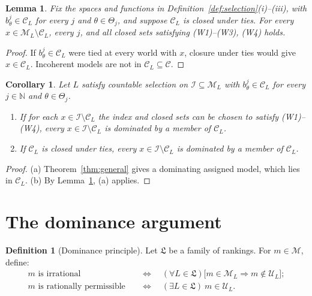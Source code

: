 \documentclass[11pt]{article}
\newtheorem{lemma}[theorem]{Lemma}
\newtheorem{corollary}[theorem]{Corollary}
\theoremstyle{definition}
\newtheorem{definition}[theorem]{Definition}
\theoremstyle{remark}
\newcommand{\M}{\mathcal M}
\newcommand{\C}{\mathcal C}
\newcommand{\I}{\mathcal I}
\newcommand{\U}{\mathcal U}
\newcommand{\Lf}{\mathfrak L}
\begin{document}
\begin{lemma}\label{lem:tie-sufficient}
Fix the spaces and functions in Definition~\ref{def:selection}(i)--(iii), with $b^j_\theta\in\C_L$ for every $j$ and $\theta\in\Theta_j$, and suppose $\C_L$ is closed under ties. For every $x\in\M_L\setminus\C_L$, every $j$, and all closed sets satisfying (W1)--(W3), (W4) holds.
\end{lemma}
\begin{proof}
If $b^j_\theta\in\C_L$ were tied at every world with $x$, closure under ties would give $x\in\C_L$. Incoherent models are not in $\C_L\subseteq\C$.
\end{proof}

\begin{corollary}\label{cor:coherent-assigned}
Let $L$ satisfy countable selection on $\I\subseteq\M_L$ with $b^j_\theta\in\C_L$ for every $j\in\mathbb N$ and $\theta\in\Theta_j$.
\begin{enumerate}[label=(\alph*)]
\item If for each $x\in\I\setminus\C_L$ the index and closed sets can be chosen to satisfy (W1)--(W4), every $x\in\I\setminus\C_L$ is dominated by a member of $\C_L$.
\item If $\C_L$ is closed under ties, every $x\in\I\setminus\C_L$ is dominated by a member of $\C_L$.
\end{enumerate}
\end{corollary}
\begin{proof}
(a) Theorem~\ref{thm:general} gives a dominating assigned model, which lies in $\C_L$. (b) By Lemma~\ref{lem:tie-sufficient}, (a) applies.
\end{proof}

\section{The dominance argument}\label{sec:conclusion}

\begin{definition}[Dominance principle]\label{def:permissibility}
Let $\Lf$ be a family of rankings. For $m\in\M$, define:
\begin{align*}
m\text{ is irrational}&\quad\Longleftrightarrow\quad (\forall L\in\Lf)\bigl[m\in\M_L\Rightarrow m\notin\U_L\bigr];\\
m\text{ is rationally permissible}&\quad\Longleftrightarrow\quad (\exists L\in\Lf)\ m\in\U_L.
\end{align*}
\end{definition}
\end{document}
